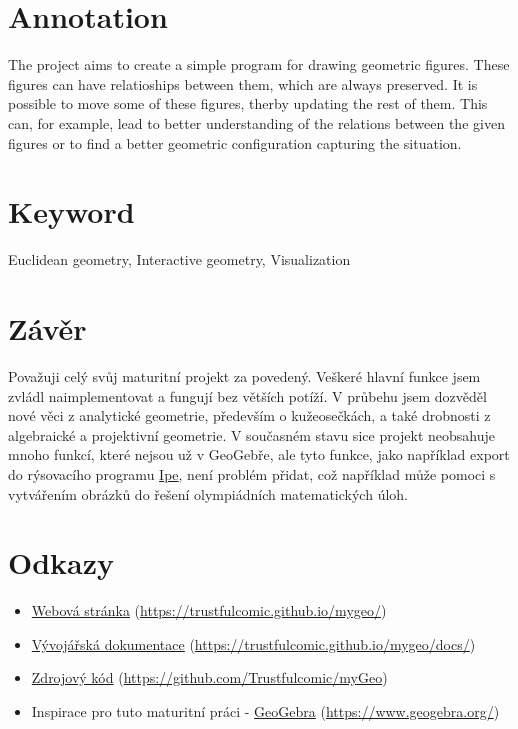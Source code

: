 \documentclass[11pt]{article}
\newcommand{\odkaz}[2]{
    \href{#1}{#2} (\href{#1}{#1})
}
\begin{document}
    \section*{Annotation}
    The project aims to create a simple program for drawing geometric figures. These figures can have relatioships between them, which are always preserved. It is possible to move some of these figures, therby updating the rest of them. This can, for example, lead to better understanding of the relations between the given figures or to find a better geometric configuration capturing the situation.
    \section*{Keyword}
    Euclidean geometry, Interactive geometry, Visualization
    \newpage

    \tableofcontents
    \newpage
    
    \pagestyle{plain}
    
    \newpage

    \section{Závěr}
    Považuji celý svůj maturitní projekt za povedený. Veškeré hlavní funkce jsem zvládl naimplementovat a fungují bez větších potíží. V průbehu jsem dozvěděl nové věci z analytické geometrie, především o kužeosečkách, a také drobnosti z algebraické a projektivní geometrie. V současném stavu sice projekt neobsahuje mnoho funkcí, které nejsou už v GeoGebře, ale tyto funkce, jako například export do rýsovacího programu \href{https://ipe.otfried.org/}{Ipe}, není problém přidat, což například může pomoci s vytvářením obrázků do řešení olympiádních matematických úloh.

    \section{Odkazy}
    \begin{itemize}
        \itemsep0em
        \item \odkaz{https://trustfulcomic.github.io/mygeo/}{Webová stránka}
        \item \odkaz{https://trustfulcomic.github.io/mygeo/docs/}{Vývojářská dokumentace}
        \item \odkaz{https://github.com/Trustfulcomic/myGeo}{Zdrojový kód}
        \item Inspirace pro tuto maturitní práci - \odkaz{https://www.geogebra.org/}{GeoGebra}
    \end{itemize}
\end{document}

